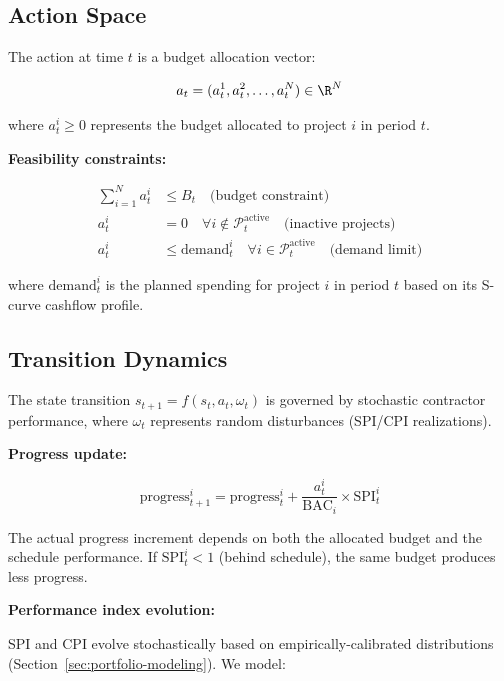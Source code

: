 \subsection{Action Space}

The action at time $t$ is a budget allocation vector:

\begin{equation}
a_t = (a_t^1, a_t^2, \ldots, a_t^N) \in \R^N
\end{equation}

where $a_t^i \geq 0$ represents the budget allocated to project $i$ in period $t$.

\textbf{Feasibility constraints:}

\begin{align}
\sum_{i=1}^N a_t^i &\leq B_t \quad \text{(budget constraint)} \label{eq:budget_constraint} \\
a_t^i &= 0 \quad \forall i \notin \mathcal{P}_t^{\text{active}} \quad \text{(inactive projects)} \label{eq:inactive_constraint} \\
a_t^i &\leq \text{demand}_t^i \quad \forall i \in \mathcal{P}_t^{\text{active}} \quad \text{(demand limit)} \label{eq:demand_constraint}
\end{align}

where $\text{demand}_t^i$ is the planned spending for project $i$ in period $t$ based on its S-curve cashflow profile.

\subsection{Transition Dynamics}

The state transition $s_{t+1} = f(s_t, a_t, \omega_t)$ is governed by stochastic contractor performance, where $\omega_t$ represents random disturbances (SPI/CPI realizations).

\textbf{Progress update:}

\begin{equation}
\text{progress}_{t+1}^i = \text{progress}_t^i + \frac{a_t^i}{\text{BAC}_i} \times \text{SPI}_t^i
\end{equation}

The actual progress increment depends on both the allocated budget and the schedule performance. If $\text{SPI}_t^i < 1$ (behind schedule), the same budget produces less progress.

\textbf{Performance index evolution:}

SPI and CPI evolve stochastically based on empirically-calibrated distributions (Section~\ref{sec:portfolio-modeling}). We model:

